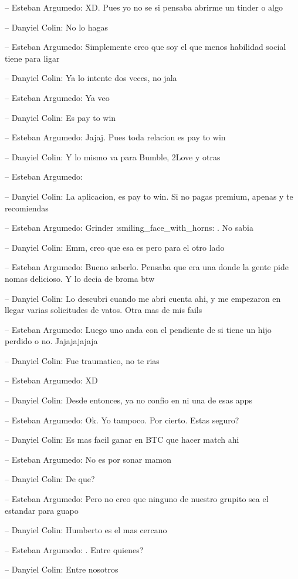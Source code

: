 -- Esteban Argumedo: XD. Pues yo no se si pensaba abrirme un tinder o
algo

-- Danyiel Colin: No lo hagas

-- Esteban Argumedo: Simplemente creo que soy el que menos habilidad
social tiene para ligar

-- Danyiel Colin: Ya lo intente dos veces, no jala

-- Esteban Argumedo: Ya veo

-- Danyiel Colin: Es pay to win

-- Esteban Argumedo: Jajaj. Pues toda relacion es pay to win

-- Danyiel Colin: Y lo mismo va para Bumble, 2Love y otras

-- Esteban Argumedo:

-- Danyiel Colin: La aplicacion, es pay to win. Si no pagas premium,
apenas y te recomiendas

-- Esteban Argumedo: Grinder :smiling\_face\_with\_horns: . No sabia

-- Danyiel Colin: Emm, creo que esa es pero para el otro lado

-- Esteban Argumedo: Bueno saberlo. Pensaba que era una donde la gente
pide nomas delicioso. Y lo decia de broma btw

-- Danyiel Colin: Lo descubri cuando me abri cuenta ahi, y me empezaron
en llegar varias solicitudes de vatos. Otra mas de mis fails

-- Esteban Argumedo: Luego uno anda con el pendiente de si tiene un hijo
perdido o no. Jajajajajaja

-- Danyiel Colin: Fue traumatico, no te rias

-- Esteban Argumedo: XD

-- Danyiel Colin: Desde entonces, ya no confio en ni una de esas apps

-- Esteban Argumedo: Ok. Yo tampoco. Por cierto. Estas seguro?

-- Danyiel Colin: Es mas facil ganar en BTC que hacer match ahi

-- Esteban Argumedo: No es por sonar mamon

-- Danyiel Colin: De que?

-- Esteban Argumedo: Pero no creo que ninguno de nuestro grupito sea el
estandar para guapo

-- Danyiel Colin: Humberto es el mas cercano

-- Esteban Argumedo: . Entre quienes?

-- Danyiel Colin: Entre nosotros

